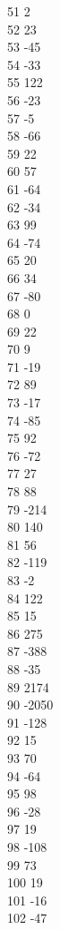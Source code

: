 { 51	2 \\
 52	23 \\
 53	-45 \\
 54	-33 \\
 55	122 \\
 56	-23 \\
 57	-5 \\
 58	-66 \\
 59	22 \\
 60	57 \\
 61	-64 \\
 62	-34 \\
 63	99 \\
 64	-74 \\
 65	20 \\
 66	34 \\
 67	-80 \\
 68	0 \\
 69	22 \\
 70	9 \\
 71	-19 \\
 72	89 \\
 73	-17 \\
 74	-85 \\
 75	92 \\
 76	-72 \\
 77	27 \\
 78	88 \\
 79	-214 \\
 80	140 \\
 81	56 \\
 82	-119 \\
 83	-2 \\
 84	122 \\
 85	15 \\
 86	275 \\
 87	-388 \\
 88	-35 \\
 89	2174 \\
 90	-2050 \\
 91	-128 \\
 92	15 \\
 93	70 \\
 94	-64 \\
 95	98 \\
 96	-28 \\
 97	19 \\
 98	-108 \\
 99	73 \\
 100	19 \\
 101	-16 \\
 102	-47 \\
}
